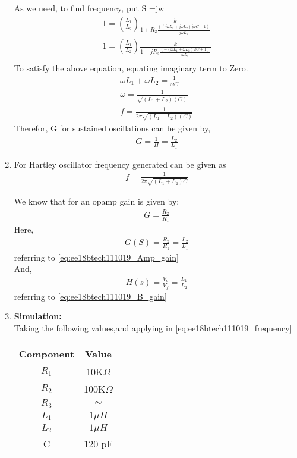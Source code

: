 \begin{enumerate}[label=\thesubsection.\arabic*.,ref=\thesubsection.\theenumi]
As we need, to find frequency, put S =jw
\begin{align}
   1 = (\frac{L_1}{L_2})\frac{k}{1 + R_2\frac{((j\omega L_1 + j\omega L_2)j\omega C + 1)}{j\omega L_1}}\\
   1 = (\frac{L_1}{L_2})\frac{k}{1 -j R_2\frac{(-(\omega L_1 + \omega L_2)\omega C + 1)}{\omega L_1}}\\
\end{align}
To satisfy the above equation, equating imaginary term to Zero.
\begin{align}    
    \omega L_1 + \omega L_2  = \frac{1}{\omega C}\\
    \omega = \frac{1}{\sqrt{(L_1+L_2)(C)}}\\
    f = \frac{1}{2\pi \sqrt{(L_1+L_2)(C)}}
\end{align}
Therefor, G for sustained oscillations can be given by,\\
\begin{align}
    G = \frac{1}{H}
     =  \frac{L_2}{L_1} 
\label{eq:ee18btech111019_Amp_gain}
\end{align}
 
\item For Hartley oscillator frequency generated can be given as 
\begin{align}
    f = \frac{1}{2\pi\sqrt{(L_1 + L_2)C}}
    \label{eq:ee18btech111019_frequency}
\end{align}

We know that for an opamp gain is given by:
\begin{align}
    G = \frac{R_2}{R_1}
\end{align}
Here,
\begin{align}
    G(S) = \frac{R_2}{R_1} = \frac{L_2}{L_1}
\end{align}
referring to \ref{eq:ee18btech111019_Amp_gain}\\
And,
\begin{align}
    H(s) = \frac{V_o}{V_f} = \frac{L_1}{L_2}
\end{align}
referring to \ref{eq:ee18btech111019_B_gain}\\
\newline
\item \textbf{Simulation:}\\
Taking the following values,and applying in \ref{eq:ee18btech111019_frequency} \\



\begin{tabular}{|c|c|}
\hline
Component & Value  \\
\hline
$R_1$         & 10K$\Omega$   \\
\hline
$R_2$         & 100K$\Omega$   \\
\hline
$R_3$         & $\sim$  \\
\hline
$L_1$         & $1 \mu H$     \\
\hline
$L_2$         & $1 \mu H$   \\
\hline
C         & 120 pF \\
\hline
\end{tabular}
\\


\end{enumerate}
